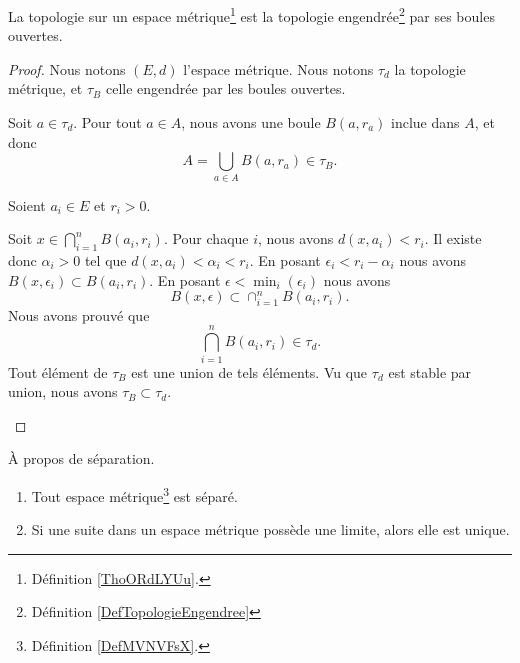 \begin{proposition}     \label{PROPooZXTXooEMLgMn}
	La topologie sur un espace métrique\footnote{Définition \ref{ThoORdLYUu}.} est la topologie engendrée\footnote{Définition \ref{DefTopologieEngendree}} par ses boules ouvertes.
\end{proposition}

\begin{proof}
	Nous notons \( (E,d)\) l'espace métrique. Nous notons \( \tau_d\) la topologie métrique, et \( \tau_B\) celle engendrée par les boules ouvertes.
	\begin{subproof}
		Soit \( a\in\tau_d\). Pour tout \( a\in A\), nous avons une boule \( B(a,r_a)\) inclue dans \( A\), et donc
		\begin{equation}
			A=\bigcup_{a\in A}B(a,r_a)\in \tau_B.
		\end{equation}

		Soient \( a_i\in E\) et \( r_i>0\).

		\begin{subproof}
			\spitem[\( \bigcap_{i=1}^nB(a_i,r_i)\in \tau_d\)]
			Soit \( x\in\bigcap_{i=1}^nB(a_i,r_i)\). Pour chaque \( i\), nous avons \( d(x,a_i)<r_i\). Il existe donc \( \alpha_i>0\) tel que \( d(x,a_i)<\alpha_i<r_i\). En posant \( \epsilon_i<r_i-\alpha_i\) nous avons \( B(x,\epsilon_i)\subset B(a_i,r_i)\). En posant \( \epsilon<\min_i(\epsilon_i)\) nous avons
			\begin{equation}
				B(x,\epsilon)\subset\cap_{i=1}^nB(a_i,r_i).
			\end{equation}
			\spitem[Et donc]
			Nous avons prouvé que
			\begin{equation}
				\bigcap_{i=1}^nB(a_i,r_i)\in\tau_d.
			\end{equation}
			Tout élément de \( \tau_B\) est une union de tels éléments. Vu que \( \tau_d\) est stable par union, nous avons \( \tau_B\subset\tau_d\).
		\end{subproof}
	\end{subproof}
\end{proof}

\begin{proposition}
	À propos de séparation.
	\begin{enumerate}
		\item
		      Tout espace métrique\footnote{Définition \ref{DefMVNVFsX}.} est séparé.
		\item
		      Si une suite dans un espace métrique possède une limite, alors elle est unique.
	\end{enumerate}
\end{proposition}

